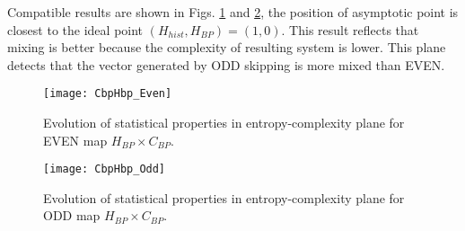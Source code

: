 Compatible results are shown in Figs. \ref{fig:EVEN_HC} and \ref{fig:ODD_HC}, the position of asymptotic point is closest to the ideal point $(H_{hist}, H_{BP})=(1, 0)$.
This result reflects that mixing is better because the complexity of resulting system is lower.
This plane detects that the vector generated by ODD skipping is more mixed than EVEN.
 
\begin{figure}[htpb]
	\centering
	\texttt{[image: CbpHbp\_Even]}
	\caption{Evolution of statistical properties in entropy-complexity plane for EVEN map $H_{BP} \times C_{BP}$.}
	\label{fig:EVEN_HC}
\end{figure}

\begin{figure}[htpb]
	\centering
	\texttt{[image: CbpHbp\_Odd]}
	\caption{Evolution of statistical properties in entropy-complexity plane for ODD map $H_{BP} \times C_{BP}$.}
	\label{fig:ODD_HC}
\end{figure}